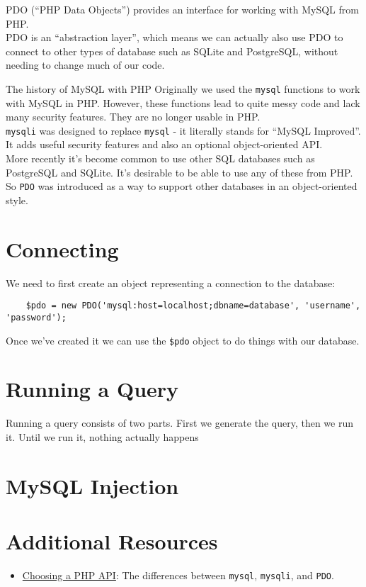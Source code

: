 PDO (``PHP Data Objects'') provides an interface for working with MySQL from PHP.
\\

PDO is an ``abstraction layer'', which means we can actually also use PDO to connect to other types of database such as SQLite and PostgreSQL, without needing to change much of our code.


\begin{infobox}{The history of MySQL with PHP}
    Originally we used the \texttt{mysql} functions to work with MySQL in PHP. However, these functions lead to quite messy code and lack many security features. They are no longer usable in PHP.
    \\

    \texttt{mysqli} was designed to replace \texttt{mysql} - it literally stands for ``MySQL Improved''. It adds useful security features and also an optional object-oriented API.
    \\

    More recently it's become common to use other SQL databases such as PostgreSQL and SQLite. It's desirable to be able to use any of these from PHP. So \texttt{PDO} was introduced as a way to support other databases in an object-oriented style.
\end{infobox}

\section{Connecting}

We need to first create an object representing a connection to the database:

\begin{verbatim}
    $pdo = new PDO('mysql:host=localhost;dbname=database', 'username', 'password');
\end{verbatim}

Once we've created it we can use the \texttt{\$pdo} object to do things with our database.


\section{Running a Query}

Running a query consists of two parts. First we generate the query, then we run it. Until we run it, nothing actually happens


\section{MySQL Injection}



\section{Additional Resources}

\begin{itemize}[leftmargin=*]
    \item \href{http://php.net/manual/en/mysqlinfo.api.choosing.php}{Choosing a PHP API}: The differences between \texttt{mysql}, \texttt{mysqli}, and \texttt{PDO}.
\end{itemize}
